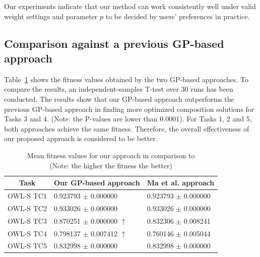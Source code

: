 
Our experiments indicate that our method can work consistently well under valid weight settings and parameter $p$ to be decided by users' preferences in practice.

\subsection{Comparison against a previous GP-based approach}\label{comparisonTest2}

Table~\ref{meanFitness_GP} shows the fitness values obtained by the two GP-based approaches. To compare the results, an independent-samples T-test over 30 runs has been conducted. The results show that our GP-based approach outperforms the previous GP-based approach \cite{ma2015hybrid} in finding more optimized composition solutions for Tasks 3 and 4. (Note: the P-values are lower than 0.0001). For Tasks 1, 2 and 5, both approaches achieve the same fitness. Therefore, the overall effectiveness of our proposed approach is considered to be better. 

\begin{table}[h!tb]
\footnotesize
\centering
\caption{Mean fitness values for our approach in comparison to \cite{ma2015hybrid}\\ (Note: the higher the fitness the better)}
\label{meanFitness_GP}
\begin{tabular}{l|l|l}
\hline
\multicolumn{1}{c|}{Task} & Our GP-based approach                  & Ma et al. approach \cite{ma2015hybrid}  \\ \hline
OWL-S TC1                     & 0.923793 $\pm$ 0.000000                & 0.923793 $\pm$ 0.000000                   \\ \hline
OWL-S TC2                     & 0.933026 $\pm$ 0.000000                & 0.933026 $\pm$ 0.000000                   \\ \hline
OWL-S TC3                     & 0.870251 $\pm$ 0.000000 $\uparrow$     & 0.832306 $\pm$ 0.008241                   \\ \hline
OWL-S TC4                     & 0.798137 $\pm$ 0.007412 $\uparrow$     & 0.760146 $\pm$ 0.005044                   \\ \hline
OWL-S TC5                     & 0.832998 $\pm$ 0.000000                & 0.832998 $\pm$ 0.000000                   \\ \hline
\end{tabular}
\end{table}

